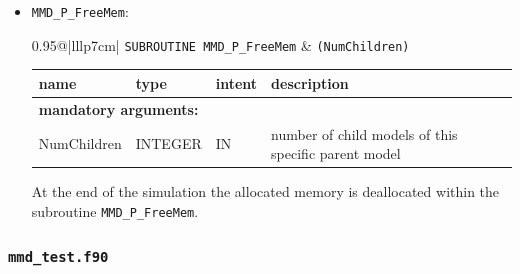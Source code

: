 \documentclass[twoside]{article}
\begin{document}
\begin{itemize}
\item  \verb|MMD_P_FreeMem|:\\
\vspace*{-0.3cm}

\begin{tabular*}{0.95\textwidth}{@{\extracolsep\fill}|lllp{7cm}|}
\hline
{}
{\tt SUBROUTINE MMD\_P\_FreeMem} &
{\tt (NumChildren)}\\
\hline
\end{tabular*}
\begin{tabular*}{0.95\textwidth}{@{\extracolsep\fill}|lllp{7cm}|}
name & type & intent & description\\
\hline
\multicolumn{4}{|l|}{\bf mandatory arguments:}\\
NumChildren & {\footnotesize INTEGER} & IN & number of child models of this specific parent model\\
\hline
\end{tabular*}
\smallskip

At the end of the simulation the allocated memory is deallocated within the 
subroutine \verb|MMD_P_FreeMem|.

\end{itemize}

\subsubsection{{\tt mmd\_test.f90}}
\end{document}
